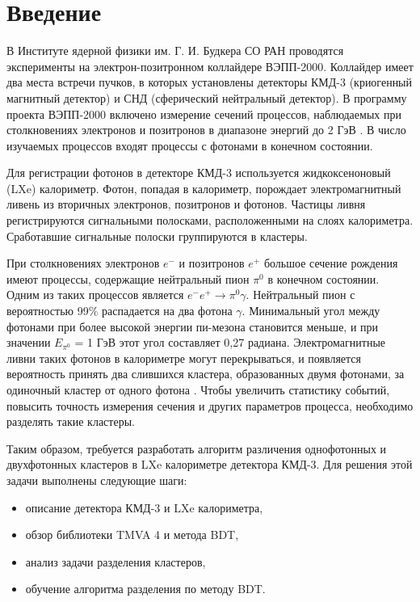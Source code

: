 \documentclass[14pt]{extarticle}
\begin{document}
	\setlength{\abovedisplayskip}{6pt}
	\setlength{\belowdisplayskip}{6pt}
	\setlength{\belowcaptionskip}{-15pt}
	\setcounter{page}{3}
	\thispagestyle{fancy}
\tableofcontents
\newpage
\section{Введение}
В Институте ядерной физики им. Г. И. Будкера СО РАН проводятся эксперименты на электрон-позитронном коллайдере ВЭПП-2000. Коллайдер имеет два места встречи пучков, в которых установлены детекторы КМД-3 (криогенный магнитный детектор) и СНД (сферический нейтральный детектор). В программу проекта ВЭПП-2000 включено измерение сечений процессов, наблюдаемых при столкновениях электронов и позитронов в диапазоне энергий до 2 ГэВ \cite{semenov}. В число изучаемых процессов входят процессы с фотонами в конечном состоянии.

Для регистрации фотонов в детекторе КМД-3 используется жидкоксеноновый (LXe) калориметр. Фотон, попадая в калориметр, порождает электромагнитный ливень из вторичных электронов, позитронов и фотонов. Частицы ливня регистрируются сигнальными полосками, расположенными на слоях калориметра. Сработавшие сигнальные полоски группируются в кластеры.

При столкновениях электронов $e^-$ и позитронов $e^+$ большое сечение рождения имеют процессы, содержащие нейтральный пион $\pi^0$ в конечном состоянии. Одним из таких процессов является $e^- e^+ \rightarrow \pi^0 \gamma$. Нейтральный пион с вероятностью 99\% распадается на два фотона $\gamma$. Минимальный угол между фотонами при более высокой энергии пи-мезона становится меньше, и при значении $E_{\pi^0}$ = 1 ГэВ этот угол составляет 0,27 радиана. Электромагнитные ливни таких фотонов в калориметре могут перекрываться, и появляется вероятность принять два слившихся кластера, образованных двумя фотонами, за одиночный кластер от одного фотона \cite{lakomov}. Чтобы увеличить статистику событий, повысить точность измерения сечения и других параметров процесса, необходимо разделять такие кластеры.

Таким образом, требуется разработать алгоритм различения однофотонных и двухфотонных кластеров в LXe калориметре детектора КМД-3. Для решения этой задачи выполнены следующие шаги:
\begin{itemize}
	\item описание детектора КМД-3 и LXe калориметра,
	\item обзор библиотеки TMVA 4 и метода BDT,
	\item анализ задачи разделения кластеров,
	\item обучение алгоритма разделения по методу BDT.
\end{itemize}
\end{document}
